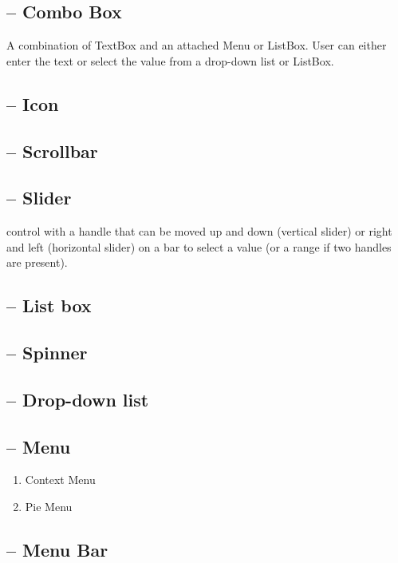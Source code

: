 \subsection{-- Combo Box}

A combination of TextBox and an attached Menu or ListBox.
User can either enter the text or select the value from a drop-down list or
ListBox.

\subsection{-- Icon}


\subsection{-- Scrollbar}


\subsection{-- Slider}

control with a handle that can be moved up and down (vertical slider) or right
and left (horizontal slider) on a bar to select a value (or a range if two handles are present).

\subsection{-- List box}

\subsection{-- Spinner}

\subsection{-- Drop-down list}

\subsection{-- Menu}

\begin{enumerate}
  \item Context Menu
  
  \item Pie Menu
\end{enumerate}

\subsection{-- Menu Bar}

